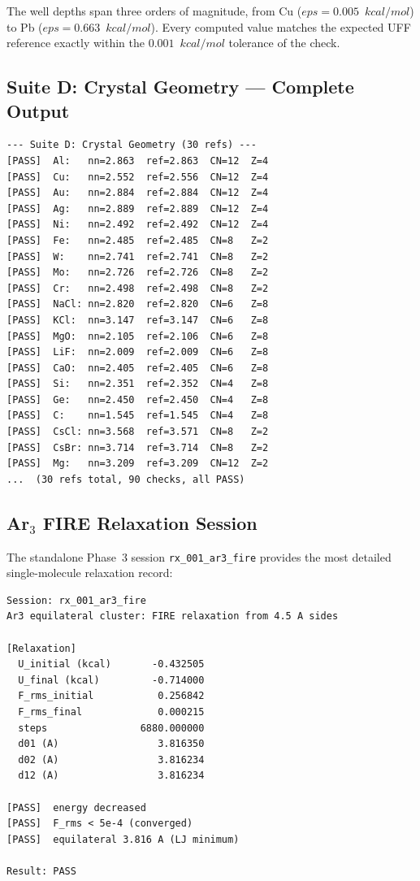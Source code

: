 \documentclass[11pt,twoside]{article}
\def\varepsilon{eps}%
\def\kcalmol{kcal/mol}%
\newcommand{\kcalmol}{\text{kcal/mol}}
\begin{document}
The well depths span three orders of magnitude, from Cu ($\varepsilon = 0.005$~$\kcalmol$) to Pb ($\varepsilon = 0.663$~$\kcalmol$). Every computed value matches the expected UFF reference exactly within the $0.001$~$\kcalmol$ tolerance of the check.

\subsection{Suite D: Crystal Geometry --- Complete Output}

\begin{lstlisting}[language={}, basicstyle=\ttfamily\scriptsize, frame=single,
  caption={Suite D crystal geometry output (verbatim, 25 of 90 checks shown; all pass)}]
--- Suite D: Crystal Geometry (30 refs) ---
[PASS]  Al:   nn=2.863  ref=2.863  CN=12  Z=4
[PASS]  Cu:   nn=2.552  ref=2.556  CN=12  Z=4
[PASS]  Au:   nn=2.884  ref=2.884  CN=12  Z=4
[PASS]  Ag:   nn=2.889  ref=2.889  CN=12  Z=4
[PASS]  Ni:   nn=2.492  ref=2.492  CN=12  Z=4
[PASS]  Fe:   nn=2.485  ref=2.485  CN=8   Z=2
[PASS]  W:    nn=2.741  ref=2.741  CN=8   Z=2
[PASS]  Mo:   nn=2.726  ref=2.726  CN=8   Z=2
[PASS]  Cr:   nn=2.498  ref=2.498  CN=8   Z=2
[PASS]  NaCl: nn=2.820  ref=2.820  CN=6   Z=8
[PASS]  KCl:  nn=3.147  ref=3.147  CN=6   Z=8
[PASS]  MgO:  nn=2.105  ref=2.106  CN=6   Z=8
[PASS]  LiF:  nn=2.009  ref=2.009  CN=6   Z=8
[PASS]  CaO:  nn=2.405  ref=2.405  CN=6   Z=8
[PASS]  Si:   nn=2.351  ref=2.352  CN=4   Z=8
[PASS]  Ge:   nn=2.450  ref=2.450  CN=4   Z=8
[PASS]  C:    nn=1.545  ref=1.545  CN=4   Z=8
[PASS]  CsCl: nn=3.568  ref=3.571  CN=8   Z=2
[PASS]  CsBr: nn=3.714  ref=3.714  CN=8   Z=2
[PASS]  Mg:   nn=3.209  ref=3.209  CN=12  Z=2
...  (30 refs total, 90 checks, all PASS)
\end{lstlisting}

\subsection{Ar$_3$ FIRE Relaxation Session}

The standalone Phase~3 session \texttt{rx\_001\_ar3\_fire} provides the most detailed single-molecule relaxation record:

\begin{lstlisting}[language={}, basicstyle=\ttfamily\scriptsize, frame=single,
  caption={Session \texttt{rx\_001\_ar3\_fire}: Ar$_3$ equilateral relaxation}]
Session: rx_001_ar3_fire
Ar3 equilateral cluster: FIRE relaxation from 4.5 A sides

[Relaxation]
  U_initial (kcal)       -0.432505
  U_final (kcal)         -0.714000
  F_rms_initial           0.256842
  F_rms_final             0.000215
  steps                6880.000000
  d01 (A)                 3.816350
  d02 (A)                 3.816234
  d12 (A)                 3.816234

[PASS]  energy decreased
[PASS]  F_rms < 5e-4 (converged)
[PASS]  equilateral 3.816 A (LJ minimum)

Result: PASS
\end{lstlisting}
\end{document}
